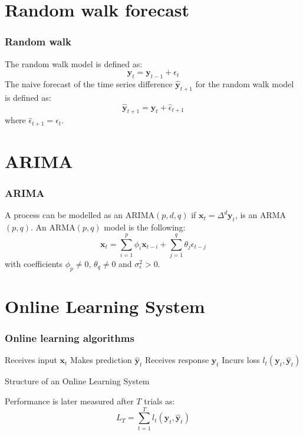 \documentclass{beamer}
\begin{document}
\section{Random walk forecast}
\begin{frame}
\frametitle{Random walk}
The random walk model is defined as:
\begin{equation}
\mathbf{y}_t = \mathbf{y}_{t-1} + \epsilon_{t}
\label{rwmodel}
\end{equation}
The naive forecast of the time series difference $\hat{\mathbf{y}}_{t+1}$ for the random walk model is defined as:
\begin{equation}
\hat{\mathbf{y}}_{t+1} = \mathbf{y}_t + \hat{\epsilon}_{t+1} 
\end{equation}
\noindent where  $\hat{\epsilon}_{t+1} = \epsilon_{t}$.
\end{frame}
%
%
\section{ARIMA}
\begin{frame}
\frametitle{ARIMA}
A process can be modelled as an ARIMA$(p,d,q)$ if $\mathbf{x}_t = \Delta^d \mathbf{y}_t $, is an ARMA$(p,q)$. An ARMA$(p,q)$ model is the following:
\begin{equation}
\mathbf{x}_t = \sum_{i=1}^p \phi_i \mathbf{x}_{t-i}  +  \sum_{j=1}^q \theta_j \epsilon_{t-j}  
\end{equation}
\noindent with coefficients $\phi_p \neq 0$, $\theta_q \neq 0$ and $\sigma_{\epsilon}^2 > 0$.
\end{frame}

\section{Online Learning System}
\begin{frame}
\frametitle{Online learning algorithms}
\begin{algorithm}[H]
\begin{algorithmic}[1]
    \STATE Receives input $\mathbf{x}_t$
    \STATE Makes prediction $\mathbf{\hat{y}}_t$
    \STATE Receives response $\mathbf{y}_t$
    \STATE Incurs loss $l_t(\mathbf{y}_t,\mathbf{\hat{y}}_t)$
\end{algorithmic}
\caption{Structure of an Online Learning System}
\end{algorithm}
Performance is later measured after $T$ trials as:
\begin{equation*}
L_T = \sum_{t=1}^T l_t(\mathbf{y}_t,\mathbf{\hat{y}}_t)
\end{equation*}
\end{frame}
\end{document}
